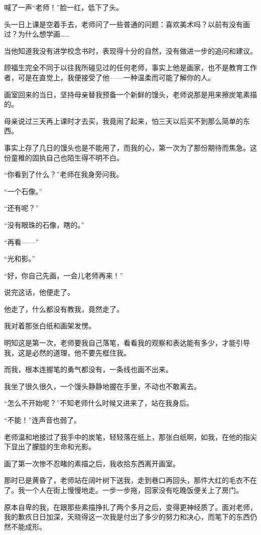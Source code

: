 \par 喊了一声“老师！”脸一红，低下了头。
\par 头一日上课是空着手去，老师问了一些普通的问题：喜欢美术吗？以前有没有画过？为什么想学画……
\par 当他知道我没有进学校念书时，表现得十分的自然，没有做进一步的追问和建议。
\par 顾福生完全不同于以往我所碰见过的任何老师，事实上他是画家，也不是教育工作者，可是在直觉上，我便接受了他——一种温柔而可能了解你的人。
\par 画室回来的当日，坚持母亲替我预备一个新鲜的馒头，老师说那是用来擦炭笔素描的。
\par 母亲说过三天再上课时才去买，我竟闹了起来，怕三天以后买不到那么简单的东西。
\par 事实上存了几日的馒头也是不能用了，而我的心，第一次为了那份期待而焦急。这份童稚的固执自己也陌生得不明不白。
\par “你看到了什么？”老师在我身旁问我。
\par “一个石像。”
\par “还有呢？”
\par “没有眼珠的石像，瞎的。”
\par “再看——”
\par “光和影。”
\par “好，你自己先画，一会儿老师再来！”
\par 说完这话，他便走了。
\par 他走了，什么都没有教我，竟然走了。
\par 我对着那张白纸和画架发愣。
\par 明知这是第一次，老师要我自己落笔，看看我的观察和表达能有多少，才能引导我，这是必然的道理，他不要先框住我。
\par 而我，根本连握笔的勇气都没有，一条线也画不出来。
\par 我坐了很久很久，一个馒头静静地握在手里，不动也不敢离去。
\par “怎么不开始呢？”不知老师什么时候又进来了，站在我身后。
\par “不能！”连声音也弱了。
\par 老师温和地接过了我手中的炭笔，轻轻落在纸上，那张白纸啊，如我，在他的指尖下显出了朦胧的生命和光影。
\par 画了第一次惨不忍睹的素描之后，我收拾东西离开画室。
\par 那时已是黄昏了，老师站在阔叶树下送我，走到巷口再回头，那件大红的毛衣不在了。我一个人在街上慢慢地走。一步一步拖，回家没有吃晚饭便关上了房门。
\par 原本自卑的我，在跟那些素描挣扎了两个多月之后，变得更神经质了。面对老师，我的歉疚日日加深，天晓得这一次我是付出了多少的努力和决心，而笔下的东西仍然不能成形。
